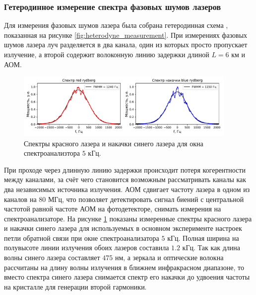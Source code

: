 \subsubsection{Гетеродинное измерение спектра фазовых шумов лазеров}

Для измерения фазовых шумов лазера была собрана гетеродинная схема \cite{Saffman_Noise}, показанная на рисунке \ref{fig:heterodyne_measurement}. При измерениях фазовых шумов лазера луч разделяется в два канала, один из которых просто пропускает излучение, а второй содержит волоконную линию задержки длиной $L = 6 \text{ км}$ и АОМ. 

\begin{figure}[H]
	\centering
	\includegraphics[width=0.95\textwidth]{images/laser_spectrums.pdf}
	\caption{Спектры красного лазера и накачки синего лазера для окна спектроанализтора $5 \text{ кГц}$.}
	\label{fig:laser_spectrums}
\end{figure}

При проходе через длинную линию задержки происходит потеря когерентности между каналами, за счёт чего становится возможным рассматривать каналы как два независимых источника излучения. АОМ сдвигает частоту лазера в одном из каналов на $80 \text{ МГц}$, что позволяет детектировать сигнал биений с центральной частотой равной частоте АОМ на фотодетекторе, снимать измерения на спектроанализаторе. На рисунке \ref{fig:laser_spectrums} показаны измеренные спектры красного лазера и накачки синего лазера для используемых в основном эксперименте настроек петли обратной связи при окне спектроанализатора $5 \text{ кГц}$. Полная ширина на полувысоте линии излучения обоих лазеров составила $1.2 \text{ кГц}$. Так как длина волны синего лазера составляет $475 \text{ нм}$, а зеркала и оптические волокна рассчитаны на длину волны излучения в ближнем инфракрасном диапазоне, то вместо спектра синего лазера снимается спектр его накачки до удвоения частоты на кристалле для генерации второй гармоники.

